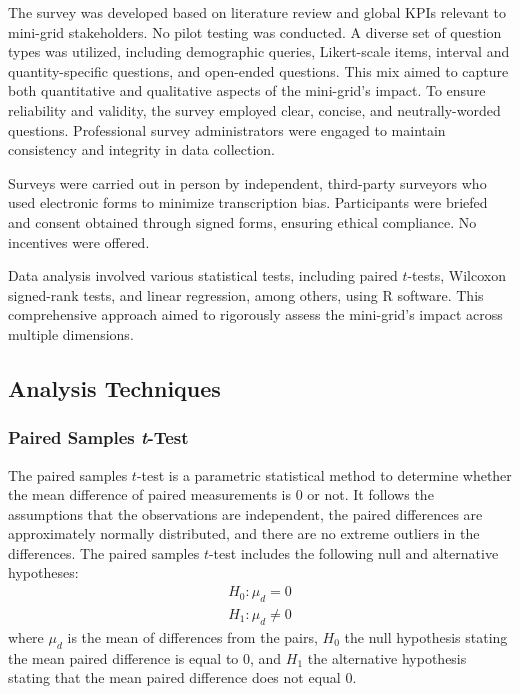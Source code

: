 The survey was developed based on literature review and global KPIs relevant to mini-grid stakeholders. No pilot testing was conducted. A diverse set of question types was utilized, including demographic queries, Likert-scale items, interval and quantity-specific questions, and open-ended questions. This mix aimed to capture both quantitative and qualitative aspects of the mini-grid's impact. To ensure reliability and validity, the survey employed clear, concise, and neutrally-worded questions. Professional survey administrators were engaged to maintain consistency and integrity in data collection.

Surveys were carried out in person by independent, third-party surveyors who used electronic forms to minimize transcription bias. Participants were briefed and consent obtained through signed forms, ensuring ethical compliance. No incentives were offered.

Data analysis involved various statistical tests, including paired $t$-tests, Wilcoxon signed-rank tests, and linear regression, among others, using R software. This comprehensive approach aimed to rigorously assess the mini-grid's impact across multiple dimensions.

\subsection{Analysis Techniques}
\subsubsection{Paired Samples \textit{t}-Test}
\hfill \break
The paired samples $t$-test is a parametric statistical method to determine whether the mean difference of paired measurements is 0 or not. It follows the assumptions that the observations are independent, the paired differences are approximately normally distributed, and there are no extreme outliers in the differences. The paired samples $t$-test includes the following null and alternative hypotheses:
\begin{equation}
\begin{array}{c}
    H_0 : \mu_d = 0 \\
    H_1 :  \mu_d \neq 0
\end{array}
\end{equation}
where $\mu_d$ is the mean of differences from the pairs, $H_0$ the null hypothesis stating the mean paired difference is equal to 0, and $H_1$ the alternative hypothesis stating that the mean paired difference does not equal 0.

